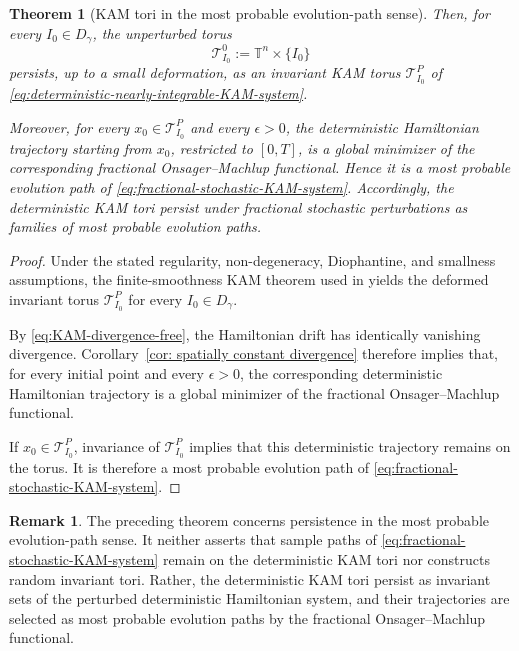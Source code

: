 \documentclass[preprint,12pt]{elsarticle}
\newtheorem{theorem}{Theorem}[section]
\theoremstyle{definition}
\newtheorem{remark}{Remark}[section]
\theoremstyle{plain}
\begin{document}
\begin{theorem}[KAM tori in the most probable evolution-path sense]
Then, for every $I_0\in D_\gamma$, the unperturbed torus
\begin{equation*}
    \mathcal T_{I_0}^{0}
    :=
    \mathbb T^n\times\{I_0\}
\end{equation*}
persists, up to a small deformation, as an invariant KAM torus
$\mathcal T_{I_0}^{P}$ of
\eqref{eq:deterministic-nearly-integrable-KAM-system}.

Moreover, for every $x_0\in\mathcal T_{I_0}^{P}$ and every
$\epsilon>0$, the deterministic Hamiltonian trajectory starting from
$x_0$, restricted to $[0,T]$, is a global minimizer of the
corresponding fractional Onsager--Machlup functional. Hence it is a
most probable evolution path of
\eqref{eq:fractional-stochastic-KAM-system}. Accordingly, the
deterministic KAM tori persist under fractional stochastic
perturbations as families of most probable evolution paths.
\end{theorem}

\begin{proof}
Under the stated regularity, non-degeneracy, Diophantine, and
smallness assumptions, the finite-smoothness KAM theorem used in
\cite{xinze2026most} yields the deformed invariant torus
$\mathcal T_{I_0}^{P}$ for every $I_0\in D_\gamma$.

By \eqref{eq:KAM-divergence-free}, the Hamiltonian drift has
identically vanishing divergence. Corollary~\ref{cor: spatially
constant divergence} therefore implies that, for every initial point
and every $\epsilon>0$, the corresponding deterministic Hamiltonian
trajectory is a global minimizer of the fractional
Onsager--Machlup functional.

If $x_0\in\mathcal T_{I_0}^{P}$, invariance of
$\mathcal T_{I_0}^{P}$ implies that this deterministic trajectory
remains on the torus. It is therefore a most probable evolution path
of \eqref{eq:fractional-stochastic-KAM-system}.
\end{proof}

\begin{remark}
The preceding theorem concerns persistence in the most probable
evolution-path sense. It neither asserts that sample paths of
\eqref{eq:fractional-stochastic-KAM-system} remain on the deterministic
KAM tori nor constructs random invariant tori. Rather, the
deterministic KAM tori persist as invariant sets of the perturbed
deterministic Hamiltonian system, and their trajectories are selected
as most probable evolution paths by the fractional
Onsager--Machlup functional.
\end{remark}
\end{document}
